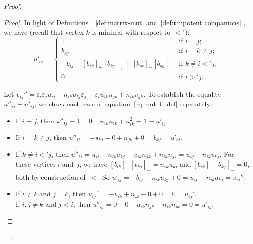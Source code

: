\documentclass[11pt, letterpaper]{amsart}
\theoremstyle{definition}
\numberwithin{equation}{section}
\begin{document}
\begin{proof}
\begin{proof}
In light of Definitions~~\ref{def:matrix-mut} and~\ref{def:unipotent companions} , we have
(recall that vertex $k$ is minimal with respect to~$<'$): 
\begin{equation}
\label{eq:muk U def}
u'_{ij} = \begin{cases}
1 & \text{if } i=j; \\
b_{kj} & \text{if } i = k \neq j; \\ 
-b_{ij} - [b_{ik}]_+[b_{kj}]_+ + [b_{ik}]_-[b_{kj}]_- & \text{if } k \ne i <' j; %
\\
0 & \text{if } i>' j.  
\end{cases}
\end{equation}

Let $u_{ij}''= \varepsilon_i \varepsilon_j u_{ij} - n_{i k} u_{k j} \varepsilon_j - \varepsilon_i u_{i k} n_{j k} + n_{i k} n_{j k}$. 
To establish the equality $u''_{ij} =  u'_{ij} $,
we check each case of equation~\eqref{eq:muk U def} separately:
\begin{itemize}[leftmargin=.2in]
\item 
If $i=j$, then  $u''_{ij} =  1 - 0 - u_{ik} n_{ik} + n_{ik}^2 = 1 = u'_{ij} $. 
\item
If $i=k \neq j$, then $ u''_{ij} = - u_{kj} - 0 + n_{jk} + 0 = b_{kj} = u'_{ij} $.
\item 
If $k \neq i <' j $, then 
$u''_{ij} = u_{ij} - n_{ik} u_{kj} - u_{ik} n_{jk} + n_{ik} n_{jk} = u_{ij} - n_{ik} u_{kj}$. 
For these vertices $i$ and~$j$, we have $[b_{ik}]_+[b_{kj}]_+= n_{ik} u_{kj}$ and $[b_{ik}]_-[b_{kj}]_- = 0$, both by construction of~$<$. 
So $u'_{ij} =-b_{ij} -n_{ik} u_{kj} +0 = u_{ij}-n_{ik}u_{kj}=u_{ij}''$.
\item
If $i\ne k$ and $j=k$, then $u_{ij}''=-u_{ik}+n_{ik}-0+0=0=u_{ij}'$. 
\\
If  $i,j \neq k$ and $j <i$, then 
$u''_{ij} = 0 - 0 - u_{ik} n_{jk} + n_{ik} n_{jk} = 0=u'_{ij}$. \qedhere
\end{itemize}
\end{proof}

\pagebreak[3]


\end{proof}
\end{document}
